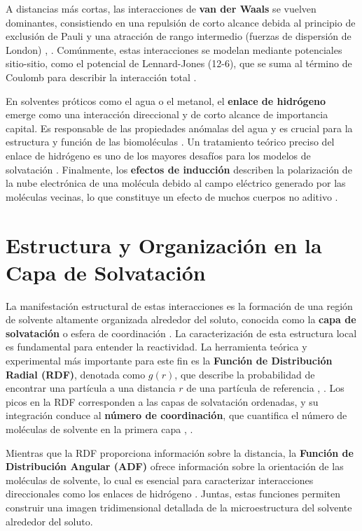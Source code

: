 A distancias más cortas, las interacciones de \textbf{van der Waals} se vuelven dominantes, consistiendo en una repulsión de corto alcance debida al principio de exclusión de Pauli y una atracción de rango intermedio (fuerzas de dispersión de London) \cite[57]{hirata2003molecular}, \cite[3]{canuto2010solvation}. Comúnmente, estas interacciones se modelan mediante potenciales sitio-sitio, como el potencial de Lennard-Jones (12-6), que se suma al término de Coulomb para describir la interacción total \cite[62, 106]{hirata2003molecular}.

En solventes próticos como el agua o el metanol, el \textbf{enlace de hidrógeno} emerge como una interacción direccional y de corto alcance de importancia capital. Es responsable de las propiedades anómalas del agua y es crucial para la estructura y función de las biomoléculas \cite[10]{hirata2003molecular}. Un tratamiento teórico preciso del enlace de hidrógeno es uno de los mayores desafíos para los modelos de solvatación \cite[5]{canuto2010solvation}. Finalmente, los \textbf{efectos de inducción} describen la polarización de la nube electrónica de una molécula debido al campo eléctrico generado por las moléculas vecinas, lo que constituye un efecto de muchos cuerpos no aditivo \cite[4]{canuto2010solvation}.

\section{Estructura y Organización en la Capa de Solvatación}

La manifestación estructural de estas interacciones es la formación de una región de solvente altamente organizada alrededor del soluto, conocida como la \textbf{capa de solvatación} o esfera de coordinación \cite[1]{canuto2010solvation}. La caracterización de esta estructura local es fundamental para entender la reactividad. La herramienta teórica y experimental más importante para este fin es la \textbf{Función de Distribución Radial (RDF)}, denotada como $g(r)$, que describe la probabilidad de encontrar una partícula a una distancia $r$ de una partícula de referencia \cite[13, 22]{hirata2003molecular}, \cite[7]{nishiyama2021molecular}. Los picos en la RDF corresponden a las capas de solvatación ordenadas, y su integración conduce al \textbf{número de coordinación}, que cuantifica el número de moléculas de solvente en la primera capa \cite[8]{canuto2010solvation}, \cite[18]{nishiyama2021molecular}.

Mientras que la RDF proporciona información sobre la distancia, la \textbf{Función de Distribución Angular (ADF)} ofrece información sobre la orientación de las moléculas de solvente, lo cual es esencial para caracterizar interacciones direccionales como los enlaces de hidrógeno \cite[279]{hirata2003molecular}. Juntas, estas funciones permiten construir una imagen tridimensional detallada de la microestructura del solvente alrededor del soluto.

